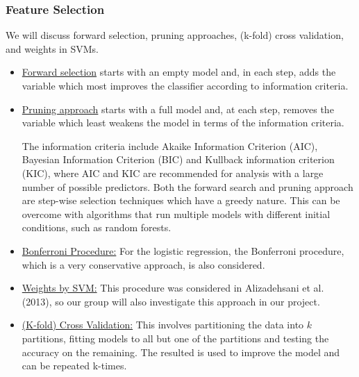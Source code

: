 \documentclass[a4paper, 12pt]{article}
\begin{document}
\subsubsection{Feature Selection}
We will discuss forward selection, pruning approaches, (k-fold) cross validation, and weights in SVMs.
\begin{itemize}
  \item \underline{Forward selection} starts with an empty model and, in each  step, adds the variable which most improves the classifier according to information criteria.
  
  \item \underline{Pruning approach} starts with a full model and, at each step, removes the variable which least weakens the model in terms of the information criteria.
  
  The information criteria include Akaike Information Criterion (AIC), Bayesian Information Criterion (BIC) and Kullback information criterion (KIC), where AIC and KIC are recommended for analysis with a large number of possible predictors. Both the forward search and pruning approach are step-wise selection techniques which have a greedy nature. This can be overcome with algorithms that run multiple models with different initial conditions, such as random forests.

    \item \underline{Bonferroni Procedure:} For the logistic regression, the Bonferroni procedure, which is a very conservative approach, is also considered.
    \item \underline{Weights by SVM:} This procedure was considered in Alizadehsani et al. (2013), so our group will also investigate this approach in our project.

    \item \underline{(K-fold) Cross Validation:} This involves partitioning the data into $k$ partitions, fitting models to all but one of the partitions and testing the accuracy on the remaining. The resulted is used to improve the model and can be repeated k-times.
\end{itemize}
\end{document}
